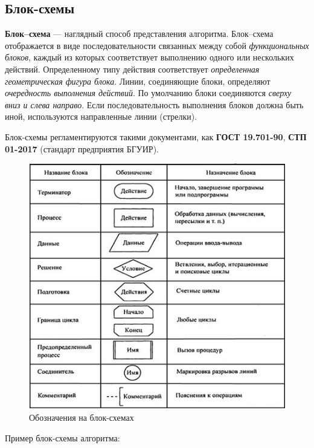 \subsection{Блок-схемы}\label{ux431ux43bux43eux43a-ux441ux445ux435ux43cux44b}

\textbf{Блок--схема} --- наглядный способ представления алгоритма.
Блок--схема отображается в виде последовательности связанных между собой
\emph{функциональных блоков}, каждый из которых соответствует выполнению
одного или нескольких действий. Определенному типу действия
соответствует \emph{определенная геометрическая фигура блока}. Линии,
соединяющие блоки, определяют \emph{очередность выполнения действий}. По
умолчанию блоки соединяются \emph{сверху вниз и слева направо}. Если
последовательность выполнения блоков должна быть иной, используются
направленные линии (стрелки).

Блок-схемы регламентируются такими документами, как \textbf{ГОСТ
19.701-90}, \textbf{СТП 01-2017} (стандарт предприятия БГУИР).

\begin{figure}
\centering
\includegraphics{./res/schematics.png}
\caption{Обозначения на блок-схемах}
\end{figure}

Пример блок-схемы алгоритма:
